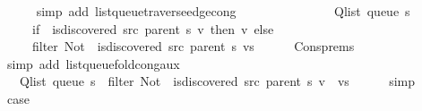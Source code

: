 \begin{isabellebody}
\ \ \ \ \isamarkupfalse%
\ {\isacharparenleft}{\kern0pt}simp\ add{\isacharcolon}{\kern0pt}\ list{\isacharunderscore}{\kern0pt}queue{\isacharunderscore}{\kern0pt}traverse{\isacharunderscore}{\kern0pt}edge{\isacharunderscore}{\kern0pt}cong{\isacharparenright}{\kern0pt}\isanewline
\ \ \isamarkupfalse%
\ \isamarkupfalse%
\isanewline
\ \ \ \ {\isachardoublequoteopen}{\isachardot}{\kern0pt}{\isachardot}{\kern0pt}{\isachardot}{\kern0pt}\ {\isacharequal}{\kern0pt}\isanewline
\ \ \ \ \ Q{\isacharunderscore}{\kern0pt}list\ {\isacharparenleft}{\kern0pt}queue\ s{\isacharparenright}{\kern0pt}\ {\isacharat}{\kern0pt}\isanewline
\ \ \ \ \ {\isacharparenleft}{\kern0pt}if\ {\isasymnot}\ is{\isacharunderscore}{\kern0pt}discovered\ src\ {\isacharparenleft}{\kern0pt}parent\ s{\isacharparenright}{\kern0pt}\ v\ then\ {\isacharbrackleft}{\kern0pt}v{\isacharbrackright}{\kern0pt}\ else\ {\isacharbrackleft}{\kern0pt}{\isacharbrackright}{\kern0pt}{\isacharparenright}{\kern0pt}\ {\isacharat}{\kern0pt}\isanewline
\ \ \ \ \ filter\ {\isacharparenleft}{\kern0pt}Not\ {\isasymcirc}\ is{\isacharunderscore}{\kern0pt}discovered\ src\ {\isacharparenleft}{\kern0pt}parent\ s{\isacharparenright}{\kern0pt}{\isacharparenright}{\kern0pt}\ vs{\isachardoublequoteclose}\isanewline
\ \ \ \ \isamarkupfalse%
\ Cons{\isachardot}{\kern0pt}prems{\isacharparenleft}{\kern0pt}{}{\isacharcomma}{\kern0pt}\ {}{\isacharparenright}{\kern0pt}\isanewline
\ \ \ \ \isamarkupfalse%
\ {\isacharparenleft}{\kern0pt}simp\ add{\isacharcolon}{\kern0pt}\ list{\isacharunderscore}{\kern0pt}queue{\isacharunderscore}{\kern0pt}fold{\isacharunderscore}{\kern0pt}cong{\isacharunderscore}{\kern0pt}aux{\isacharparenright}{\kern0pt}\isanewline
\ \ \isamarkupfalse%
\ \isamarkupfalse%
\ {\isachardoublequoteopen}{\isachardot}{\kern0pt}{\isachardot}{\kern0pt}{\isachardot}{\kern0pt}\ {\isacharequal}{\kern0pt}\ Q{\isacharunderscore}{\kern0pt}list\ {\isacharparenleft}{\kern0pt}queue\ s{\isacharparenright}{\kern0pt}\ {\isacharat}{\kern0pt}\ filter\ {\isacharparenleft}{\kern0pt}Not\ {\isasymcirc}\ is{\isacharunderscore}{\kern0pt}discovered\ src\ {\isacharparenleft}{\kern0pt}parent\ s{\isacharparenright}{\kern0pt}{\isacharparenright}{\kern0pt}\ {\isacharparenleft}{\kern0pt}v\ {\isacharhash}{\kern0pt}\ vs{\isacharparenright}{\kern0pt}{\isachardoublequoteclose}\isanewline
\ \ \ \ \isamarkupfalse%
\ simp\isanewline
\ \ \isamarkupfalse%
\ \isamarkupfalse%
\ {\isacharquery}{\kern0pt}case\isanewline

\end{isabellebody}
